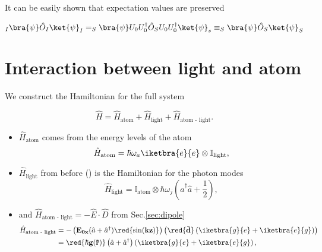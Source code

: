 It can be easily shown that expectation values are preserved

\begin{equation}
  _I\bra{\psi}\hat{O}_I\ket{\psi}_I = _S\bra{\psi}U_0U_0^\dagger\hat{O}_SU_0U_0^\dagger\ket{\psi}_s \equiv _S\bra{\psi}\hat{O}_S\ket{\psi}_S
\end{equation}

\newpage
\section{Interaction between light and atom \label{sec:lightAtom}}
We construct the Hamiltonian for the full system

\begin{equation}
  \hat{H} = \hat{H}_\text{atom} + \hat{H}_\text{light} + \hat{H}_\text{atom - light}.
\end{equation}

\begin{itemize}
\item $\hat{H}_\text{atom}$ comes from the energy levels of the atom
  \begin{equation}
    \label{eqn:atomHamiltonian}
    \hat{H}_\text{atom} = \hbar\omega_a\iketbra{e}{e}\otimes\mathbb{I}_\text{light},
  \end{equation}

\item $\hat{H}_\text{light}$ from before  () is the
  Hamiltonian for the photon modes
  \begin{equation}
    \label{eqn:lightHamiltonian}
    \hat{H}_\text{light} = \mathbb{I}_\text{atom} \otimes \hbar\omega_j\left(\hat{a}^\dagger\hat{a}+\frac{1}{2}\right),
  \end{equation}

\item  and $\hat{H}_\text{atom  - light}  =  - \hat{E}\cdot  \hat{D} $  from
  Sec.\ref{sec:dipole}
  \begin{equation}
    \begin{aligned}
      \hat{H}_\text{atom - light} & = - \left(\mathbf{E_{0x}}(\hat{a}+\hat{a}^\dagger)\mathbf{\red{\sin(kz)}}\right)\left(\red{\mathbf{\vec{d}}}\left(\iketbra{g}{e}+\iketbra{e}{g}\right)\right)\\
      &                         =                         \mathbf{\red{\hbar
          g(\vec{r})}}\left(\hat{a}+\hat{a}^\dagger\right)\left(\iketbra{g}{e}+\iketbra{e}{g}\right),
    \end{aligned}
  \end{equation}
\end{itemize}

